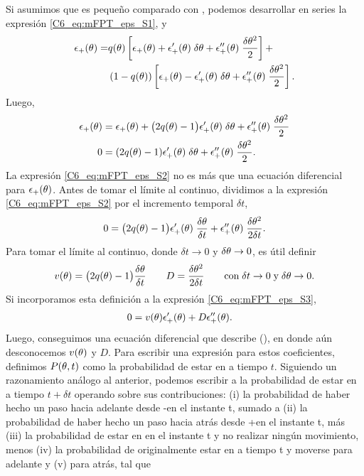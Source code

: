 \documentclass[./main.tex]{subfiles}
\begin{document}
Si asumimos que \deltax es pequeño comparado con \xx, podemos desarrollar en series la expresión \ref{C6_eq:mFPT_eps_S1}, y
\begin{align}
    \epsilon_{+}(\theta) = & q(\theta) \left[  \epsilon_{+}(\theta) + \epsilon_{+}'(\theta) \; \delta\theta + \epsilon_{+}''(\theta) \; \frac{\delta\theta^2}{2} \right] + \nonumber \\  & \left(1-q(\theta)\right) \left[  \epsilon_{+}(\theta) - \epsilon_{+}'(\theta) \; \delta\theta + \epsilon_{+}''(\theta) \; \frac{\delta\theta^2}{2} \right].
\end{align}
Luego,
\begin{align}
    \epsilon_{+}(\theta) &=  \epsilon_{+}(\theta) + \big(2q(\theta)-1\big) \epsilon_{+}'(\theta) \; \delta\theta + \epsilon_{+}''(\theta) \; \frac{\delta\theta^2}{2} \nonumber \\
    0 &=  (2q(\theta)-1) \epsilon_{+}'(\theta) \; \delta\theta + \epsilon_{+}''(\theta) \; \frac{\delta\theta^2}{2}. \label{C6_eq:mFPT_eps_S2}
\end{align}
La expresión \ref{C6_eq:mFPT_eps_S2} no es más que una ecuación diferencial para $\epsilon_{+}(\theta)$. Antes de tomar el límite al continuo, dividimos a la expresión \ref{C6_eq:mFPT_eps_S2} por el incremento temporal $\delta t$,
\begin{align}
     0 =  \big(2q(\theta)-1\big) \epsilon_{+}'(\theta) \; \frac{\delta\theta}{\delta t} + \epsilon_{+}''(\theta) \; \frac{\delta\theta^2}{2 \delta t}. 
     \label{C6_eq:mFPT_eps_S3}
\end{align}
Para tomar el límite al continuo, donde $\delta t \rightarrow   0 $ y $\delta\theta \rightarrow 0$, es útil definir
\begin{equation}
    v(\theta) = \big(2q(\theta)-1\big) \frac{\delta\theta}{\delta t} \qquad D = \frac{\delta\theta^2}{2 \delta t} \qquad \text{con} \; \delta t \rightarrow   0 \; \text{y} \; \delta\theta \rightarrow 0 .
    \label{C6_eq:mFPT_eps_def_vD}
\end{equation}
Si incorporamos esta definición a la expresión \ref{C6_eq:mFPT_eps_S3},
\begin{align}
     0 &=  v(\theta) \epsilon_{+}'(\theta) + D \epsilon_{+}''(\theta) .
     \label{C6_eq:mFPT_eps_S4}
\end{align}
Luego, conseguimos una ecuación diferencial que describe \epsplus(\xx), en donde aún desconocemos $v(\theta)$ y $D$. Para escribir una expresión para estos coeficientes, definimos $P(\theta,t)$ como la probabilidad de estar en \xx a tiempo $t$. Siguiendo un razonamiento análogo al anterior, podemos escribir a la probabilidad de estar en \xx a tiempo $t+\delta t$ operando sobre sus contribuciones: (i) la probabilidad de haber hecho un paso hacia adelante desde \xx-\deltax en el instante t, sumado a (ii) la probabilidad de haber hecho un paso hacia atrás desde \xx+\deltax en el instante t, más (iii) la probabilidad de estar en \xx en el instante t y no realizar ningún movimiento, menos (iv) la probabilidad de originalmente estar en \xx a tiempo t y moverse para adelante y (v) para atrás, tal que 
\end{document}
